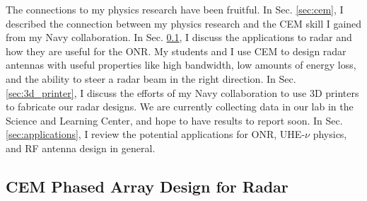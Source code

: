 \documentclass[../../../main.tex]{subfiles}
\begin{document}
The connections to my physics research have been fruitful.  In Sec. \ref{sec:cem}, I described the connection between my physics research and the CEM skill I gained from my Navy collaboration.  In Sec. \ref{sec:phased_array}, I discuss the applications to radar and how they are useful for the ONR.  My students and I use CEM to design radar antennas with useful properties like high bandwidth, low amounts of energy loss, and the ability to steer a radar beam in the right direction.  In Sec. \ref{sec:3d_printer}, I discuss the efforts of my Navy collaboration to use 3D printers to fabricate our radar designs.  We are currently collecting data in our lab in the Science and Learning Center, and hope to have results to report soon.  In Sec. \ref{sec:applications}, I review the potential applications for ONR, UHE-$\nu$ physics, and RF antenna design in general.

\subsection{CEM Phased Array Design for Radar}
\label{sec:phased_array}
\end{document}
